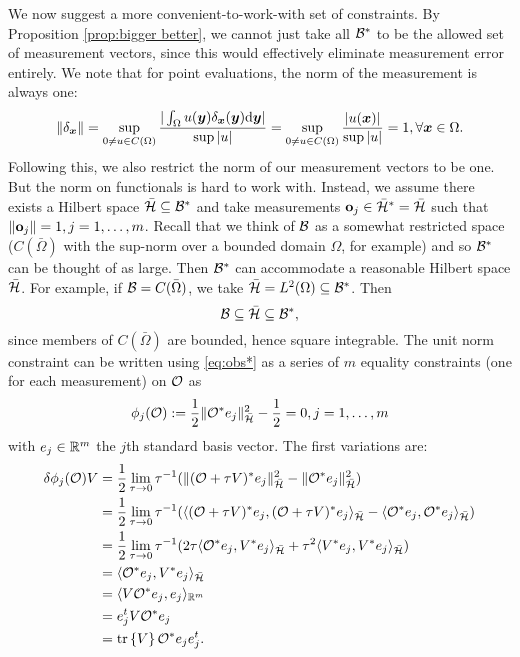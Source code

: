 \documentclass{amsart}
\numberwithin{equation}{section}
\begin{document}
We now suggest a more convenient-to-work-with set of constraints. By
Proposition \ref{prop:bigger better}, we cannot just take all $\mathcal{B}^*$
to be the allowed set of measurement vectors, since this would
effectively eliminate measurement error entirely. We note that for
point evaluations, the norm of the measurement is always one:
\begin{align*}
  \| \delta_{{\boldsymbol{x}}} \| = \sup_{0 \neq u \in C(\Omega)} \frac{
    |\int_{\Omega}u({\boldsymbol{y}}) \delta_{{\boldsymbol{x}}}({\boldsymbol{y}}) \text{\textup{d}} {\boldsymbol{y}}| 
  }{
    \sup|u|}
  = \sup_{0 \neq u \in C(\Omega)} \frac{|u({\boldsymbol{x}})|}{ \sup|u|} = 1,
  \forall {\boldsymbol{x}} \in \Omega.
\end{align*}
Following this, we also restrict the norm of our measurement vectors
to be one. But the norm on functionals is hard to work with. Instead,
we assume there exists a Hilbert space $\bar{\mathcal{H}} \subseteq \mathcal{B}^*$
and take measurements $\mathbf{o}_j \in \bar{\mathcal{H}}^* = \bar{\mathcal{H}}$ such
that $\| \mathbf{o}_j\| = 1, j=1,\dots,m$. Recall that we think of $\mathcal{B}$ as
a somewhat restricted space ($C(\bar{\Omega})$ with the sup-norm over
a bounded domain $\Omega$, for example) and so $\mathcal{B}^*$ can be thought
of as large. Then $\mathcal{B}^*$ can accommodate a reasonable Hilbert space
$\bar{\mathcal{H}}$. For example, if $\mathcal{B} = C(\bar{\Omega})$, we take
$\bar{\mathcal{H}} = L^2(\Omega) \subseteq \mathcal{B}^*$.
Then
%
\begin{equation*}
  \mathcal{B} \subseteq \bar{\mathcal{H}} \subseteq \mathcal{B}^*,
\end{equation*}
since members of $C(\bar{\Omega})$ are bounded, hence square integrable. The
unit norm constraint can be written using \eqref{eq:obs*} as a series of $m$ equality
constraints (one for each measurement) on $\mathcal{O}$ as
\begin{align}\label{eq:constraints}
  \phi_j(\mathcal{O}) :=\frac12 \| \mathcal{O}^* e_j\|_{\bar{\mathcal{H}}}^2 - \frac12 = 0,j=1,\dots,m
\end{align}
with $e_j \in \mathbb{R}^m$ the $j$th standard basis vector. The first variations are:
\begin{align*}
  \delta \phi_j(\mathcal{O})V  
  &= \frac12\lim_{\tau \to 0}\tau^{-1}
  ( \|(\mathcal{O} + \tau V)^*e_j \|_{\bar{\mathcal{H}}}^2 - \|\mathcal{O} ^*e_j \|_{\bar{\mathcal{H}}}^2  ) \\
  &= \frac12\lim_{\tau \to 0}\tau^{-1}
  ( \langle (\mathcal{O} + \tau V)^*e_j, (\mathcal{O} + \tau V)^*e_j \rangle_{\bar{\mathcal{H}}} - 
  \langle \mathcal{O}^*e_j, \mathcal{O}^*e_j \rangle_{\bar{\mathcal{H}}} ) \\
  &= \frac12\lim_{\tau \to 0}\tau^{-1}
  (2\tau \langle \mathcal{O}^*e_j,V^*e_j \rangle_{\bar{\mathcal{H}}} 
  +\tau^2 \langle V^*e_j, V^*e_j \rangle_{\bar{\mathcal{H}}} ) \\
  &= \langle \mathcal{O}^*e_j,V^*e_j \rangle_{\bar{\mathcal{H}}} \\
  &= \langle V \mathcal{O}^*e_j,e_j \rangle_{\mathbb{R}^m} \\
  &= e_j^t V \mathcal{O}^* e_j \\
  &= \textup{tr}\left \{V \right \} \mathcal{O}^* e_je_j^t.
\end{align*}
\end{document}
